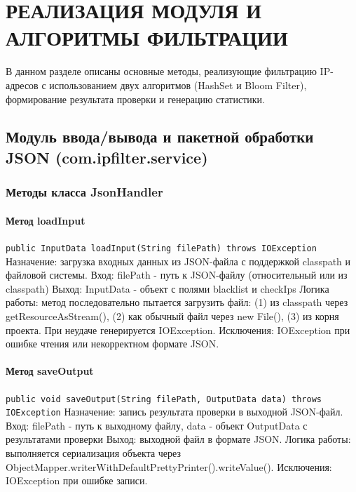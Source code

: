 \chapter{РЕАЛИЗАЦИЯ МОДУЛЯ И АЛГОРИТМЫ ФИЛЬТРАЦИИ} \label{ch2}

В данном разделе описаны основные методы, реализующие фильтрацию IP-адресов с использованием двух алгоритмов (HashSet и Bloom Filter), формирование результата проверки и генерацию статистики.



\section{Модуль ввода/вывода и пакетной обработки JSON (com.ipfilter.service)}

\subsection{ Методы класса JsonHandler}
\subsubsection{Метод loadInput}
\texttt{public InputData loadInput(String filePath) throws IOException}
Назначение: загрузка входных данных из JSON-файла с поддержкой classpath и файловой системы.
Вход: filePath - путь к JSON-файлу (относительный или из classpath)
Выход: InputData - объект с полями blacklist и checkIps
Логика работы: метод последовательно пытается загрузить файл: (1) из classpath через getResourceAsStream(), (2) как обычный файл через new File(), (3) из корня проекта. При неудаче генерируется IOException.
Исключения: IOException при ошибке чтения или некорректном формате JSON.

\subsubsection{Метод saveOutput}
\texttt{public void saveOutput(String filePath, OutputData data) throws IOException}
Назначение: запись результата проверки в выходной JSON-файл.
Вход: filePath - путь к выходному файлу, data - объект OutputData с результатами проверки
Выход: выходной файл в формате JSON.
Логика работы: выполняется сериализация объекта через ObjectMapper.writerWithDefaultPrettyPrinter().writeValue().
Исключения: IOException при ошибке записи.

